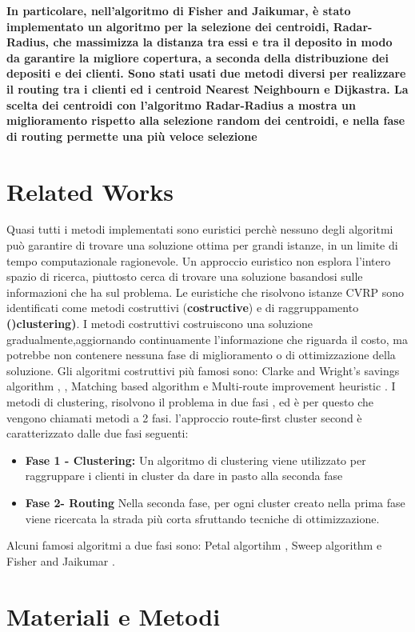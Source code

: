 \documentclass[]{article}
\begin{document}
\textbf{In particolare, nell'algoritmo di Fisher and Jaikumar, è stato implementato un algoritmo per la selezione dei centroidi, Radar-Radius, che massimizza la distanza tra essi e tra il deposito in modo da garantire la migliore copertura, a seconda della distribuzione dei depositi e dei clienti.
Sono stati usati due metodi diversi per realizzare il routing tra i clienti ed i centroid Nearest Neighbourn e Dijkastra.
La scelta dei centroidi con l'algoritmo Radar-Radius a mostra un miglioramento rispetto alla selezione random dei centroidi, e nella fase di routing permette una più veloce selezione}


\section{Related Works}
Quasi tutti i metodi implementati sono euristici perchè nessuno degli algoritmi può garantire di trovare una soluzione ottima per grandi istanze, in un limite di tempo computazionale ragionevole.
Un approccio euristico non esplora l'intero spazio di ricerca, piuttosto cerca di trovare una soluzione basandosi sulle informazioni che ha sul problema.
Le euristiche che risolvono istanze CVRP sono identificati come metodi costruttivi (\textbf{costructive}) e di raggruppamento \textbf{()clustering)}.
I metodi costruttivi costruiscono una soluzione gradualmente,aggiornando continuamente l'informazione che riguarda il costo, ma potrebbe non contenere nessuna fase di miglioramento o di ottimizzazione della soluzione.
Gli algoritmi costruttivi più famosi sono: Clarke and Wright's savings algorithm \cite{CK} , \cite{CK2} , Matching based algorithm e Multi-route improvement heuristic \cite{CK3}.
I metodi di clustering, risolvono il problema in due fasi , ed è per questo che vengono chiamati metodi a 2 fasi.  l'approccio route-first cluster second è caratterizzato dalle due fasi seguenti:
\begin{itemize}
\item \textbf{Fase 1 - Clustering:} Un algoritmo di clustering viene utilizzato per raggruppare i clienti in cluster da dare in pasto alla seconda fase
\item \textbf{Fase 2- Routing} Nella seconda fase, per ogni cluster creato nella prima fase viene ricercata la strada più corta sfruttando tecniche di ottimizzazione.
\end{itemize}
Alcuni famosi algoritmi a due fasi sono: Petal algortihm \cite{petal}, Sweep algorithm \cite{sweep} e Fisher and Jaikumar \cite{FJ}.

\section{Materiali e Metodi}





\end{document}
